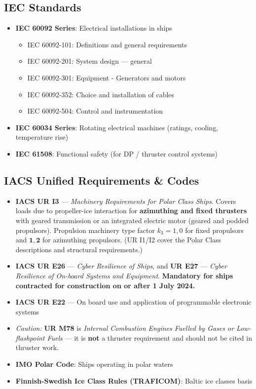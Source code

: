 \documentclass[11pt,a4paper]{report}
\begin{document}
\subsection{IEC Standards}
\begin{itemize}[leftmargin=*]
\item \textbf{IEC 60092 Series}: Electrical installations in ships
\begin{itemize}
\item IEC 60092-101: Definitions and general requirements
\item IEC 60092-201: System design --- general
\item IEC 60092-301: Equipment - Generators and motors
\item IEC 60092-352: Choice and installation of cables
\item IEC 60092-504: Control and instrumentation
\end{itemize}
\item \textbf{IEC 60034 Series}: Rotating electrical machines (ratings, cooling, temperature rise)
\item \textbf{IEC 61508}: Functional safety (for DP / thruster control systems)
\end{itemize}

\subsection{IACS Unified Requirements \& Codes}
\begin{itemize}[leftmargin=*]
\item \textbf{IACS UR I3} --- \emph{Machinery Requirements for Polar Class Ships}.
Covers loads due to propeller-ice interaction for \textbf{azimuthing and fixed
thrusters} with geared transmission or an integrated electric motor (geared and
podded propulsors). Propulsion machinery type factor $k_3 = 1{,}0$ for fixed
propulsors and $\mathbf{1{,}2}$ for azimuthing propulsors. (UR I1/I2 cover the
Polar Class descriptions and structural requirements.)
\item \textbf{IACS UR E26} --- \emph{Cyber Resilience of Ships}, and
\textbf{UR E27} --- \emph{Cyber Resilience of On-board Systems and Equipment}.
\textbf{Mandatory for ships contracted for construction on or after 1 July 2024.}
\item \textbf{IACS UR E22} --- On board use and application of programmable
electronic systems
\item \textit{Caution:} \textbf{UR M78} is \emph{Internal Combustion Engines
Fuelled by Gases or Low-flashpoint Fuels} --- it is \textbf{not} a thruster
requirement and should not be cited in thruster work.
\item \textbf{IMO Polar Code}: Ships operating in polar waters
\item \textbf{Finnish-Swedish Ice Class Rules (TRAFICOM)}: Baltic ice classes basis
\end{itemize}
\end{document}

